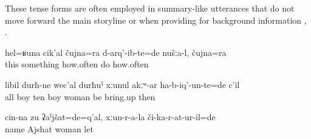 These tense forms are often employed in summary-like utterances that do not move forward the main storyline  or when providing for background information , .
%
\begin{exe}
	\ex	\label{ex:Things like this, how often did we do them, how often}
	\gll	hel=ʁuna	cik'al	čujna=ra	d-arq'-ib-te=de	nušːa-l,	čujna=ra\\
		this	something	how.often	do		how.often\\
	\glt	{}
	
	\ex	\label{ex:All children, ten children (he) rose without his wife then}
	\gll	libil	durħ-ne	wec'al	durħuˁ	xːunul	akːʷ-ar		ha-b-iq'-un-te=de	c'il\\
		all	boy	ten	boy	woman 	be	bring.up	then\\
	\glt	{}

	\ex	\label{ex:‎Her name was Ajshat, she was sent there as the (leader) of the women}
	\gll	cin-na	zu	ʡaˁjšat=de=q'al,	xːun-r-a-la	či-ka-r-at-ur-il=de\\
			name	Ajshat	woman	let\\
	\glt	{}
\end{exe}

